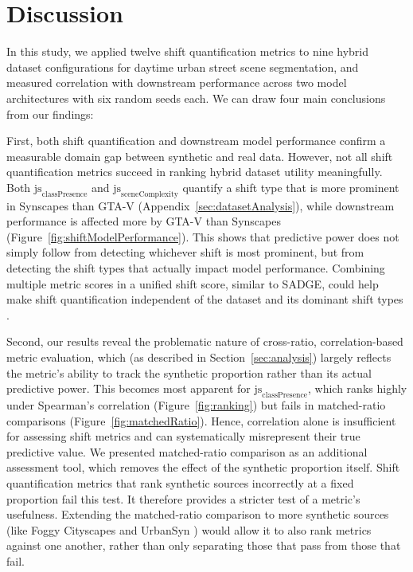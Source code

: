 \documentclass[conference]{IEEEtran}
\begin{document}
\section{Discussion}
In this study, we applied twelve shift quantification metrics to nine hybrid dataset configurations for daytime urban street scene segmentation, and measured correlation with downstream performance across two model architectures with six random seeds each. We can draw four main conclusions from our findings:

First, both shift quantification and downstream model performance confirm a measurable domain gap between synthetic and real data. However, not all shift quantification metrics succeed in ranking hybrid dataset utility meaningfully. Both $\text{js}_{\text{classPresence}}$ and $\text{js}_{\text{sceneComplexity}}$ quantify a shift type that is more prominent in Synscapes than GTA-V (Appendix~\ref{sec:datasetAnalysis}), while downstream performance is affected more by GTA-V than Synscapes (Figure~\ref{fig:shiftModelPerformance}). This shows that predictive power does not simply follow from detecting whichever shift is most prominent, but from detecting the shift types that actually impact model performance. Combining multiple metric scores in a unified shift score, similar to SADGE, could help make shift quantification independent of the dataset and its dominant shift types \cite{bartkowiak2026, duminil2025}.

Second, our results reveal the problematic nature of cross-ratio, correlation-based metric evaluation, which (as described in Section~\ref{sec:analysis}) largely reflects the metric's ability to track the synthetic proportion rather than its actual predictive power. This becomes most apparent for $\text{js}_{\text{classPresence}}$, which ranks highly under Spearman's correlation (Figure~\ref{fig:ranking}) but fails in matched-ratio comparisons (Figure~\ref{fig:matchedRatio}). Hence, correlation alone is insufficient for assessing shift metrics and can systematically misrepresent their true predictive value. We presented matched-ratio comparison as an additional assessment tool, which removes the effect of the synthetic proportion itself. Shift quantification metrics that rank synthetic sources incorrectly at a fixed proportion fail this test. It therefore provides a stricter test of a metric's usefulness. Extending the matched-ratio comparison to more synthetic sources (like Foggy Cityscapes \cite{foggyCityscapes} and UrbanSyn \cite{urbansyn}) would allow it to also rank metrics against one another, rather than only separating those that pass from those that fail.
\end{document}
